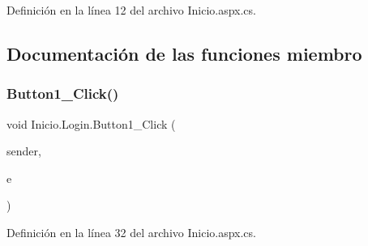 Definición en la línea 12 del archivo Inicio.\+aspx.\+cs.



\subsection{Documentación de las funciones miembro}
\mbox{\label{classInicio_1_1Login_a4c72ae6605baac8dff22e547df892ba1}} 
\subsubsection{\texorpdfstring{Button1\_Click()}{Button1\_Click()}}
{\footnotesize\ttfamily void Inicio.\+Login.\+Button1\+\_\+\+Click (\begin{DoxyParamCaption}\item[{object}]{sender,  }\item[{Event\+Args}]{e }\end{DoxyParamCaption})\hspace{0.3cm}{\ttfamily [protected]}}



Definición en la línea 32 del archivo Inicio.\+aspx.\+cs.


